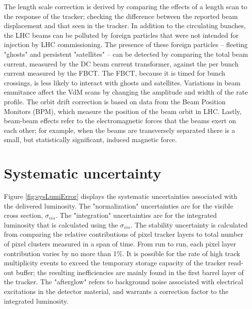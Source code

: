 The length scale correction is derived by comparing the effects of a length scan to the response of the tracker; checking the difference between the reported beam displacement and that seen in the tracker. In addition to the circulating bunches, the LHC beams can be polluted by foreign particles that were not intended for injection by LHC commissioning. The presence of these foreign particles -- fleeting "ghosts" and persistent "satellites" -- can be detected by comparing the total beam current, measured by the DC beam current transformer, against the per bunch current measured by the FBCT. The FBCT, because it is timed for bunch crossings, is less likely to interact with ghosts and satellites. Variations in beam emmitance affect the VdM scans by changing the amplitude and width of the rate profile. The orbit drift correction is based on data from the Beam Position Monitors (BPM), which measure the position of the beam orbit in LHC. Lastly, beam-beam effects refer to the electromagnetic forces that the beams exert on each other; for example, when the beams are transversely separated there is a small, but statistically significant, induced magnetic force. 

\section{Systematic uncertainty}

Figure \ref{fig:sysLumiError} displays the systematic uncertainties associated with the delivered luminosity. The "normalization" uncertainties are for the visible cross section, $\sigma_{vis}$. The "integration" uncertainties are for the integrated luminosity that is calculated using the $\sigma_{vis}$. The stability uncertainty is calculated from comparing the relative contributions of pixel tracker layers to total number of pixel clusters measured in a span of time. From run to run, each pixel layer contribution varies by no more than 1\%. It is possible for the rate of high track multiplicity events to exceed the temporary storage capacity of the tracker read-out buffer; the resulting inefficiencies are mainly found in the first barrel layer of the tracker. The "afterglow" refers to background noise associated with electrical excitations in the detector material, and warrants a correction factor to the integrated luminosity. 

